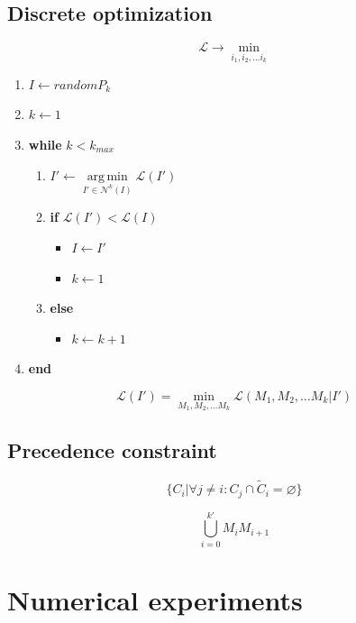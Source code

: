 \documentclass{ifacconf}
\DeclareMathOperator*{\argmin}{arg\,min}
\begin{document}
\subsection{Discrete optimization}
$$
\mathcal L \to \min_{i_1, i_2, \dots i_k}
$$
\begin{enumerate}
  \item $ I \gets random P_k$
  \item $ k \gets 1$
  \item \textbf{while} $k < k_{max}$
  \begin{enumerate}
  \item $ I' \gets \argmin\limits_{I' \in \mathcal N^k(I)} \mathcal L(I')$
  \item \textbf{if} $\mathcal L(I') < \mathcal L(I)$
  \begin{itemize}
      \item $I \gets I'$
      \item $ k \gets 1$
  \end{itemize}
  \item \textbf{else}
  \begin{itemize}
      \item $ k \gets k+1$
  \end{itemize}
  \end{enumerate}
  \item \textbf{end}
\end{enumerate}
$$
\mathcal L(I') = \min_{M_1, M_2, \dots M_k} \mathcal L(M_1, M_2, \dots M_k | I')
$$

\subsection{Precedence constraint}
\begin{equation}
\big\{
    C_i | \forall j \ne i: C_j \cap \tilde C_i = \varnothing
\big\}
\label{non-outers}
\end{equation}

\begin{equation}
  \bigcup_{i=0}^{k'} M_i M_{i+1}
\label{path-found}
\end{equation}

\section{Numerical experiments}
\end{document}
